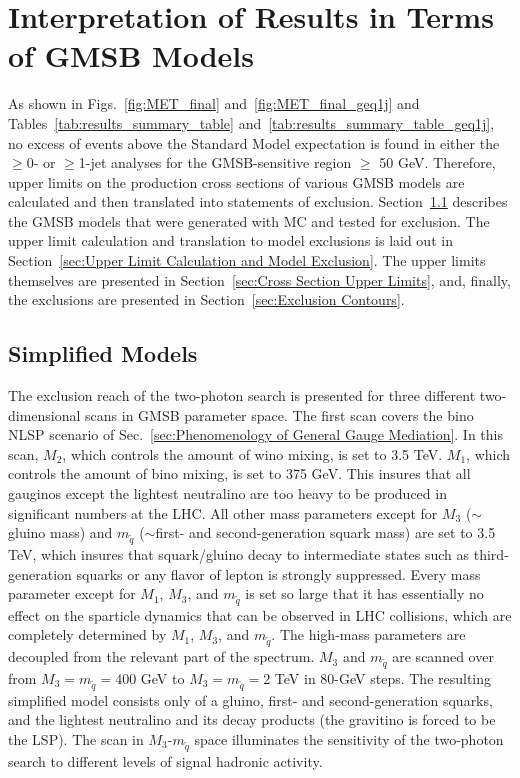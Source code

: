\documentclass[dissertation.tex]{subfiles}
\begin{document}
\chapter{Interpretation of Results in Terms of GMSB Models}
\label{chap:Interpretation of Results in Terms of GMSB Models}

\thispagestyle{myheadings}
\markright{\hfill}

As shown in Figs.~\ref{fig:MET_final} and~\ref{fig:MET_final_geq1j} and Tables~\ref{tab:results_summary_table} and~\ref{tab:results_summary_table_geq1j}, no excess of events above the Standard Model expectation is found in either the $\geq$0- or $\geq$1-jet analyses for the GMSB-sensitive region \MET $\geq$ 50 GeV.  Therefore, upper limits on the production cross sections of various GMSB models are calculated and then translated into statements of exclusion.  Section~\ref{sec:Simplified Models} describes the GMSB models that were generated with MC and tested for exclusion.  The upper limit calculation and translation to model exclusions is laid out in Section~\ref{sec:Upper Limit Calculation and Model Exclusion}.  The upper limits themselves are presented in Section~\ref{sec:Cross Section Upper Limits}, and, finally, the exclusions are presented in Section~\ref{sec:Exclusion Contours}.

\section{Simplified Models}
\label{sec:Simplified Models}

The exclusion reach of the two-photon search is presented for three different two-dimensional scans in GMSB parameter space.  The first scan covers the bino NLSP scenario of Sec.~\ref{sec:Phenomenology of General Gauge Mediation}.  In this scan, $M_{2}$, which controls the amount of wino mixing, is set to 3.5 TeV.  $M_{1}$, which controls the amount of bino mixing, is set to 375 GeV.  This insures that all gauginos except the lightest neutralino are too heavy to be produced in significant numbers at the LHC.  All other mass parameters except for $M_{3}$ ($\sim$gluino mass) and $m_{\tilde{q}}$ ($\sim$first- and second-generation squark mass) are set to 3.5 TeV, which insures that squark/gluino decay to intermediate states such as third-generation squarks or any flavor of lepton is strongly suppressed.  Every mass parameter except for $M_{1}$, $M_{3}$, and $m_{\tilde{q}}$ is set so large that it has essentially no effect on the sparticle dynamics that can be observed in LHC collisions, which are completely determined by $M_{1}$, $M_{3}$, and $m_{\tilde{q}}$.  The high-mass parameters are decoupled from the relevant part of the spectrum.  $M_{3}$ and $m_{\tilde{q}}$ are scanned over from $M_{3} = m_{\tilde{q}} = 400$ GeV to $M_{3} = m_{\tilde{q}} = 2$ TeV in 80-GeV steps.  The resulting simplified model consists only of a gluino, first- and second-generation squarks, and the lightest neutralino and its decay products (the gravitino is forced to be the LSP).  The scan in $M_{3}$-$m_{\tilde{q}}$ space illuminates the sensitivity of the two-photon search to different levels of signal hadronic activity.
\end{document}
